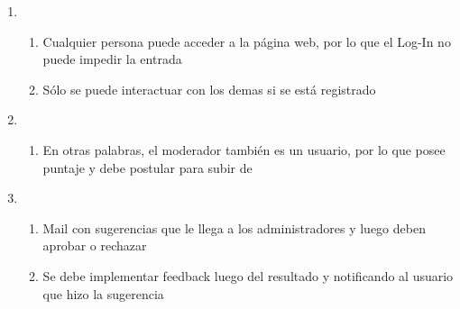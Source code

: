 \documentclass[12pt, letterpaper, notitlepage]{article}
\begin{document}
\begin{enumerate}
		\item {}
		\begin{enumerate}
			\item Cualquier persona puede acceder a la página web, por lo que el Log-In no puede impedir la entrada
			\item Sólo se puede interactuar con los demas si se está registrado
		\end{enumerate}				
		
		\item {}
		\begin{enumerate}
			\item En otras palabras, el moderador también es un usuario, por lo que posee puntaje y debe postular para subir de 
		\end{enumerate}
		
		\item {}
		\begin{enumerate}
			\item Mail con sugerencias que le llega a los administradores y luego deben aprobar o rechazar
			\item Se debe implementar feedback luego del resultado y notificando al usuario que hizo la sugerencia
		\end{enumerate}			
		
	\end{enumerate}
	
	
	
	
\end{document}
